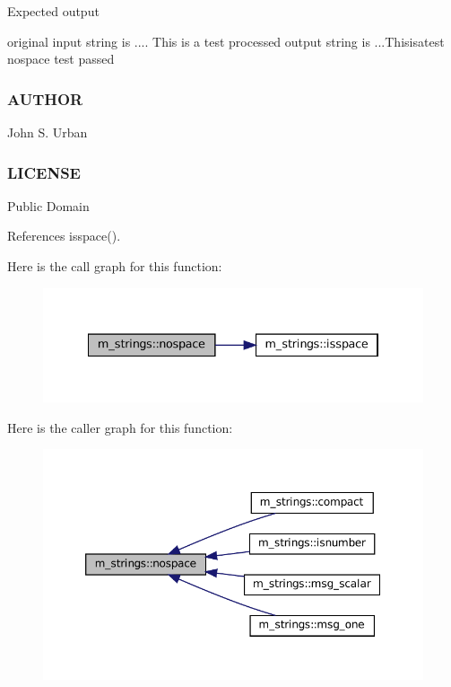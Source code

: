 Expected output \begin{DoxyVerb}original input string is ....  This     is      a     test
processed output string is ...Thisisatest
nospace test passed
\end{DoxyVerb}
 \subsubsection*{A\+U\+T\+H\+OR}

John S. Urban \subsubsection*{L\+I\+C\+E\+N\+SE}

Public Domain 

References isspace().

Here is the call graph for this function\+:
\nopagebreak
\begin{figure}[H]
\begin{center}
\leavevmode
\includegraphics[width=334pt]{namespacem__strings_ad007f050abe3d142f4a7badbc4408685_cgraph}
\end{center}
\end{figure}
Here is the caller graph for this function\+:
\nopagebreak
\begin{figure}[H]
\begin{center}
\leavevmode
\includegraphics[width=350pt]{namespacem__strings_ad007f050abe3d142f4a7badbc4408685_icgraph}
\end{center}
\end{figure}
\mbox{\label{namespacem__strings_a3bf44ac06a670f55830e17a6f1108b9c}} 
